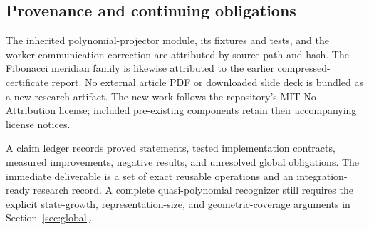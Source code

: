 \subsection{Provenance and continuing obligations}

The inherited polynomial-projector module, its fixtures and tests, and the
worker-communication correction are attributed by source path and hash.
The Fibonacci meridian family is likewise attributed to the earlier
compressed-certificate report. No external article PDF or downloaded slide
deck is bundled as a new research artifact. The new work follows the
repository's MIT No Attribution license; included pre-existing components
retain their accompanying license notices.

A claim ledger records proved statements, tested implementation contracts,
measured improvements, negative results, and unresolved global obligations.
The immediate deliverable is a set of exact reusable operations and an
integration-ready research record. A complete quasi-polynomial recognizer
still requires the explicit state-growth, representation-size, and
geometric-coverage arguments in Section~\ref{sec:global}.
